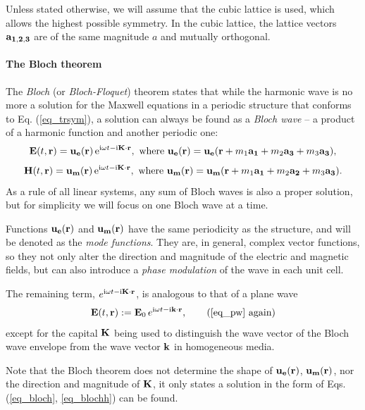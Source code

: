 Unless stated otherwise, we will assume that the cubic lattice is used, which allows the highest possible symmetry. In the cubic lattice, the lattice vectors ${\mathbf{a_{1,2,3}}}$ are of the same magnitude $a$ and mutually orthogonal. %

\paragraph{The Bloch theorem}%
The \textit{Bloch} (or \textit{Bloch-Floquet}) theorem states that while the harmonic wave is no more a solution for the Maxwell equations in a periodic structure that conforms to Eq. (\ref{eq_trsym}), a solution can always be found as a \textit{Bloch wave} -- a product of a harmonic function and another periodic one:
\begin{equation} 
\mathbf{E}(t, {\mathbf{r}}) = \mathbf{u_e}({\mathbf{r}})\,\mathrm{e}^{{\mathrm i}\omega t - {\mathrm i}{\mathbf{K}}\cdot{\mathbf{r}}}, \text{ where } \mathbf{u_e}({\mathbf{r}}) = \mathbf{u_e}({\mathbf{r}} + m_1 {\mathbf{a_1}} + m_2 {\mathbf{a_3}} + m_3 {\mathbf{a_3}}),
\label{eq_bloch}\end{equation} 
\begin{equation}
\mathbf{H}(t, {\mathbf{r}}) = \mathbf{u_m}({\mathbf{r}})\,\mathrm{e}^{{\mathrm i}\omega t - {\mathrm i}{\mathbf{K}}\cdot{\mathbf{r}}}, \text{ where } \mathbf{u_m}({\mathbf{r}}) = \mathbf{u_m}({\mathbf{r}} + m_1 {\mathbf{a_1}} + m_2 {\mathbf{a_2}} + m_3 {\mathbf{a_3}}).
\label{eq_blochh}\end{equation} 
As a rule of all linear systems, any sum of Bloch waves is also a proper solution, but for simplicity we will focus on one Bloch wave at a time.

Functions $\mathbf{u_e}({\mathbf{r}})$ and $\mathbf{u_m}({\mathbf{r}})$ have the same periodicity as the structure, and will be denoted as the \textit{mode functions}. They are, in general, complex vector functions, so they not only alter the direction and magnitude of the electric and magnetic fields, but can also introduce a \textit{phase modulation} of the wave in each unit cell. 

The remaining term, $e^{{\mathrm i}\omega t - {\mathrm i}{\mathbf{K}}\cdot{\mathbf{r}}}$, is analogous to that of a plane wave
\begin{equation} \E(t, \rr) := \E_0\, e^{\ii\omega t - \ii\kk\cdot\rr}, \tag{\ref{eq_pw} \again} \end{equation}
except for the capital ${\mathbf{K}}$ being used to distinguish the wave vector of the Bloch wave envelope from the wave vector ${\mathbf{k}}$ in homogeneous media. 

Note that the Bloch theorem does not determine the shape of $\mathbf{u_e}({\mathbf{r}})$, $\mathbf{u_m}({\mathbf{r}})$, nor the direction and magnitude of ${\mathbf{K}}$, it only states a solution in the form of Eqs. (\ref{eq_bloch}, \ref{eq_blochh}) can be found.

